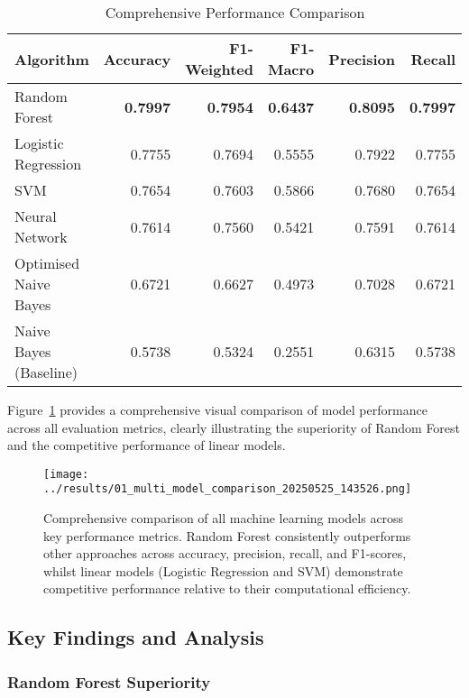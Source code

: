 \documentclass[11pt,a4paper]{article}
\begin{document}
\begin{table}[H]
    \centering
    \caption{Comprehensive Performance Comparison}
    \label{tab:results}
    \begin{tabular}{@{}lrrrrr@{}}
        \toprule
        \textbf{Algorithm} & \textbf{Accuracy} & \textbf{F1-Weighted} & \textbf{F1-Macro} & \textbf{Precision} & \textbf{Recall} \\
        \midrule
        Random Forest & \textbf{0.7997} & \textbf{0.7954} & \textbf{0.6437} & \textbf{0.8095} & \textbf{0.7997} \\
        Logistic Regression & 0.7755 & 0.7694 & 0.5555 & 0.7922 & 0.7755 \\
        SVM & 0.7654 & 0.7603 & 0.5866 & 0.7680 & 0.7654 \\
        Neural Network & 0.7614 & 0.7560 & 0.5421 & 0.7591 & 0.7614 \\
        Optimised Naive Bayes & 0.6721 & 0.6627 & 0.4973 & 0.7028 & 0.6721 \\
        Naive Bayes (Baseline) & 0.5738 & 0.5324 & 0.2551 & 0.6315 & 0.5738 \\
        \bottomrule
    \end{tabular}
\end{table}

Figure~\ref{fig:model_comparison} provides a comprehensive visual comparison of model performance across all evaluation metrics, clearly illustrating the superiority of Random Forest and the competitive performance of linear models.

\begin{figure}[H]
    \centering
    \texttt{[image: ../results/01\_multi\_model\_comparison\_20250525\_143526.png]}
    \caption{Comprehensive comparison of all machine learning models across key performance metrics. Random Forest consistently outperforms other approaches across accuracy, precision, recall, and F1-scores, whilst linear models (Logistic Regression and SVM) demonstrate competitive performance relative to their computational efficiency.}
    \label{fig:model_comparison}
\end{figure}

\subsection{Key Findings and Analysis}

\subsubsection{Random Forest Superiority}
\end{document}
